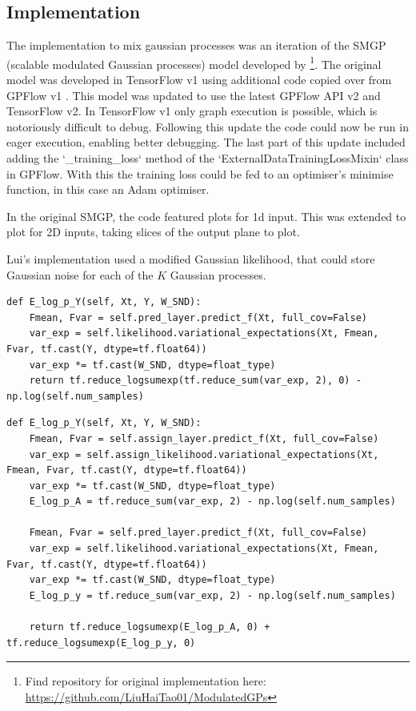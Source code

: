 \documentclass[12pt,a4paper]{report}
\theoremstyle{definition}
\begin{document}
\subsection{Implementation}

The implementation to mix gaussian processes was an iteration of the SMGP (scalable modulated Gaussian processes) model developed by \citet{Lui2020} \footnote{Find repository for original implementation here: \url{https://github.com/LiuHaiTao01/ModulatedGPs}}.
The original model was developed in TensorFlow v1 using additional code copied over from GPFlow v1 \citep{GPflow2017}.
This model was updated to use the latest GPFlow API v2 and TensorFlow v2.
In TensorFlow v1 only graph execution is possible, which is notoriously difficult to debug.
Following this update the code could now be run in eager execution, enabling better debugging.
The last part of this update included adding the `_training_loss` method of the `ExternalDataTrainingLossMixin` class in GPFlow.
With this the training loss could be fed to an optimiser's minimise function, in this case an Adam optimiser.

In the original SMGP, the code featured plots for 1d input. 
This was extended to plot for 2D inputs, taking slices of the output plane to plot.

Lui's implementation used a modified Gaussian likelihood, that could store Gaussian noise for each of the $K$ Gaussian processes. 

\begin{lstlisting}[label=code:SMGPElogpY,  caption={E\_log\_p\_Y for the original SMGP using \citet{Lui2020} lowerbound}]
def E_log_p_Y(self, Xt, Y, W_SND):
    Fmean, Fvar = self.pred_layer.predict_f(Xt, full_cov=False)
    var_exp = self.likelihood.variational_expectations(Xt, Fmean, Fvar, tf.cast(Y, dtype=tf.float64))
    var_exp *= tf.cast(W_SND, dtype=float_type)
    return tf.reduce_logsumexp(tf.reduce_sum(var_exp, 2), 0) - np.log(self.num_samples)
\end{lstlisting}

\begin{lstlisting}[label=code:SMGPModifiedElogpY,  caption={E\_log\_p\_Y for the modified SMGP using \citet{Kaiser2018} lowerbound}]
def E_log_p_Y(self, Xt, Y, W_SND):
    Fmean, Fvar = self.assign_layer.predict_f(Xt, full_cov=False)
    var_exp = self.assign_likelihood.variational_expectations(Xt, Fmean, Fvar, tf.cast(Y, dtype=tf.float64))
    var_exp *= tf.cast(W_SND, dtype=float_type)
    E_log_p_A = tf.reduce_sum(var_exp, 2) - np.log(self.num_samples)

    Fmean, Fvar = self.pred_layer.predict_f(Xt, full_cov=False)
    var_exp = self.likelihood.variational_expectations(Xt, Fmean, Fvar, tf.cast(Y, dtype=tf.float64))
    var_exp *= tf.cast(W_SND, dtype=float_type)
    E_log_p_y = tf.reduce_sum(var_exp, 2) - np.log(self.num_samples)

    return tf.reduce_logsumexp(E_log_p_A, 0) + tf.reduce_logsumexp(E_log_p_y, 0)
\end{lstlisting}
\end{document}
